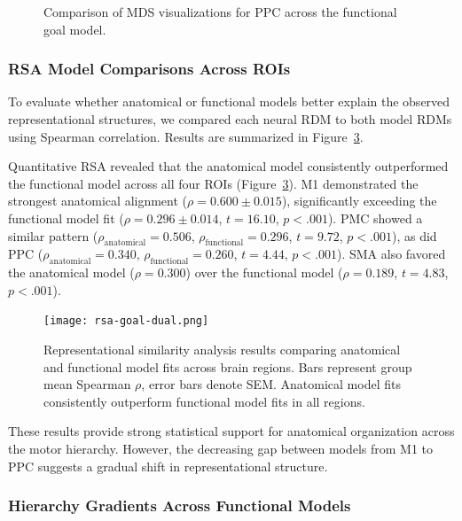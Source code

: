\documentclass{article}
\begin{document}
\begin{figure}[!htbp]
\begin{subfigure}[b]{0.45\textwidth}
        \label{fig:mds_coord}
    \end{subfigure}
    \caption{Comparison of MDS visualizations for PPC across the functional goal model.}
    \label{fig:mds_comparison_models}
\end{figure}


\subsubsection{RSA Model Comparisons Across ROIs}
To evaluate whether anatomical or functional models better explain the observed representational structures, we compared each neural RDM to both model RDMs using Spearman correlation. Results are summarized in Figure~\ref{fig:rsa}.

Quantitative RSA revealed that the anatomical model consistently outperformed the functional model across all four ROIs (Figure~\ref{fig:rsa}). M1 demonstrated the strongest anatomical alignment (\(\rho = 0.600 \pm 0.015\)), significantly exceeding the functional model fit (\(\rho = 0.296 \pm 0.014\), \(t = 16.10\), \(p < .001\)). PMC showed a similar pattern (\(\rho_{\text{anatomical}} = 0.506\), \(\rho_{\text{functional}} = 0.296\), \(t = 9.72\), \(p < .001\)), as did PPC (\(\rho_{\text{anatomical}} = 0.340\), \(\rho_{\text{functional}} = 0.260\), \(t = 4.44\), \(p < .001\)). SMA also favored the anatomical model (\(\rho = 0.300\)) over the functional model (\(\rho = 0.189\), \(t = 4.83\), \(p < .001\)).

\begin{figure}[!htbp]
\centering
\texttt{[image: rsa-goal-dual.png]}
\caption{Representational similarity analysis results comparing anatomical and functional model fits across brain regions. Bars represent group mean Spearman \(\rho\), error bars denote SEM. Anatomical model fits consistently outperform functional model fits in all regions.}
\label{fig:rsa}
\end{figure}

These results provide strong statistical support for anatomical organization across the motor hierarchy. However, the decreasing gap between models from M1 to PPC suggests a gradual shift in representational structure.

\subsubsection{Hierarchy Gradients Across Functional Models}
\end{document}
